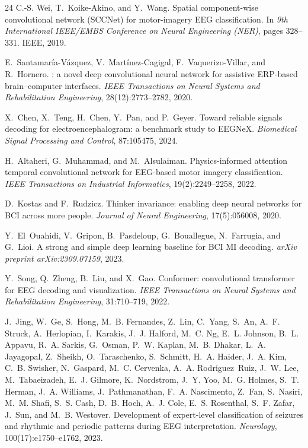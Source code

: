 \documentclass[11pt,a4paper]{article}
\begin{document}
\begin{thebibliography}{24}
C.-S. Wei, T.~Koike-Akino, and Y.~Wang.
\newblock Spatial component-wise convolutional network ({SCCNet}) for
  motor-imagery {EEG} classification.
\newblock In \emph{9th International IEEE/EMBS Conference on Neural Engineering
  (NER)}, pages 328--331. IEEE, 2019.

E.~Santamar{\'i}a-V{\'a}zquez, V.~Mart{\'i}nez-Cagigal, F.~Vaquerizo-Villar,
  and R.~Hornero.
: a novel deep convolutional neural network for
  assistive {ERP}-based brain--computer interfaces.
\newblock \emph{IEEE Transactions on Neural Systems and Rehabilitation
  Engineering}, 28(12):2773--2782, 2020.

X.~Chen, X.~Teng, H.~Chen, Y.~Pan, and P.~Geyer.
\newblock Toward reliable signals decoding for electroencephalogram: a
  benchmark study to {EEGNeX}.
\newblock \emph{Biomedical Signal Processing and Control}, 87:105475, 2024.

H.~Altaheri, G.~Muhammad, and M.~Alsulaiman.
\newblock Physics-informed attention temporal convolutional network for
  {EEG}-based motor imagery classification.
\newblock \emph{IEEE Transactions on Industrial Informatics}, 19(2):2249--2258,
  2022.

D.~Kostas and F.~Rudzicz.
\newblock Thinker invariance: enabling deep neural networks for {BCI} across
  more people.
\newblock \emph{Journal of Neural Engineering}, 17(5):056008, 2020.

Y.~El~Ouahidi, V.~Gripon, B.~Pasdeloup, G.~Bouallegue, N.~Farrugia, and
  G.~Lioi.
\newblock A strong and simple deep learning baseline for {BCI} {MI} decoding.
\newblock \emph{arXiv preprint arXiv:2309.07159}, 2023.

Y.~Song, Q.~Zheng, B.~Liu, and X.~Gao.
 Conformer: convolutional transformer for {EEG} decoding and
  visualization.
\newblock \emph{IEEE Transactions on Neural Systems and Rehabilitation
  Engineering}, 31:710--719, 2022.

J.~Jing, W.~Ge, S.~Hong, M.~B. Fernandes, Z.~Lin, C.~Yang, S.~An, A.~F.
  Struck, A.~Herlopian, I.~Karakis, J.~J. Halford, M.~C. Ng, E.~L. Johnson,
  B.~L. Appavu, R.~A. Sarkis, G.~Osman, P.~W. Kaplan, M.~B. Dhakar, L.~A.
  Jayagopal, Z.~Sheikh, O.~Taraschenko, S.~Schmitt, H.~A. Haider, J.~A. Kim,
  C.~B. Swisher, N.~Gaspard, M.~C. Cervenka, A.~A. Rodriguez~Ruiz, J.~W. Lee,
  M.~Tabaeizadeh, E.~J. Gilmore, K.~Nordstrom, J.~Y. Yoo, M.~G. Holmes, S.~T.
  Herman, J.~A. Williams, J.~Pathmanathan, F.~A. Nascimento, Z.~Fan,
  S.~Nasiri, M.~M. Shafi, S.~S. Cash, D.~B. Hoch, A.~J. Cole, E.~S. Rosenthal,
  S.~F. Zafar, J.~Sun, and M.~B. Westover.
\newblock Development of expert-level classification of seizures and rhythmic
  and periodic patterns during {EEG} interpretation.
\newblock \emph{Neurology}, 100(17):e1750--e1762, 2023.


\end{thebibliography}
\end{document}
